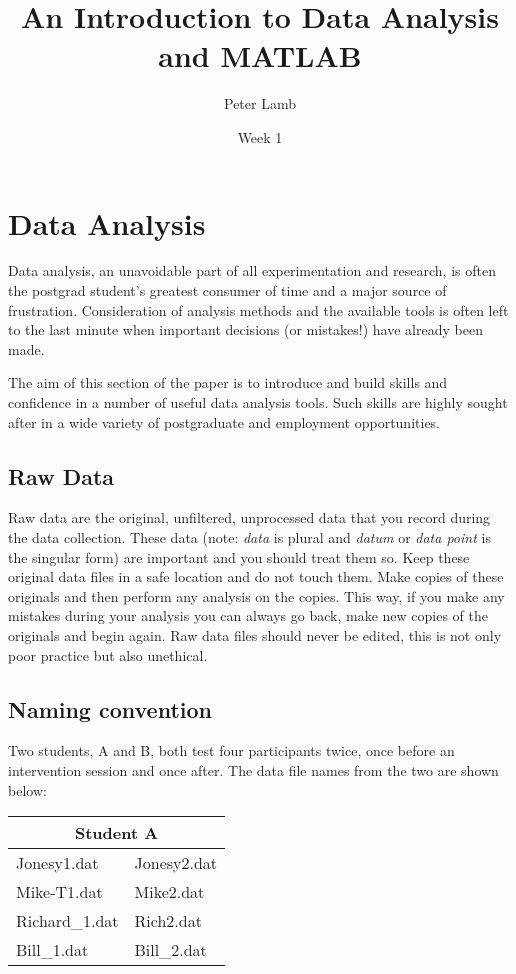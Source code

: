 \documentclass[12pt,a4paper]{article}
\title{An Introduction to Data Analysis and MATLAB}
\author{Peter Lamb}
\date{Week 1}
\begin{document}
\maketitle

\section{Data Analysis}
Data analysis, an unavoidable part of all experimentation and research, is often the postgrad student's greatest consumer of time and a major source of frustration.  
Consideration of analysis methods and the available tools is often left to the last minute when important decisions (or mistakes!) have already been made.

The aim of this section of the paper is to introduce and build skills and confidence in a number of useful data analysis tools.  
Such skills are highly sought after in a wide variety of postgraduate and employment opportunities.

\subsection{Raw Data}
Raw data are the original, unfiltered, unprocessed data that you record during the data collection.  
These data (note: \emph{data} is plural and \emph{datum} or \emph{data point} is the singular form) are important and you should treat them so.  
Keep these original data files in a safe location and do not touch them.  
Make copies of these originals and then perform any analysis on the copies.  
This way, if you make any mistakes during your analysis you can always go back, make new copies of the originals and begin again.
Raw data files should never be edited, this is not only poor practice but also unethical.

\subsection{Naming convention}
Two students, A and B, both test four participants twice, once before an intervention session and once after.  
The data file names from the two are shown below:

\begin{table}[H]
  \begin{center}
    \begin{tabular}{|l|l|}
    \hline
    \multicolumn{2}{|c|}{Student A} \\
    \hline
    Jonesy1.dat & Jonesy2.dat \\
    \hline
    Mike-T1.dat & Mike2.dat \\
    \hline
    Richard\_1.dat & Rich2.dat \\
    \hline
    Bill\_1.dat & Bill\_2.dat \\
    \hline
    \end{tabular}
  \end{center}  
  \label{tab:namingconventionsa}
\end{table}
\end{document}
